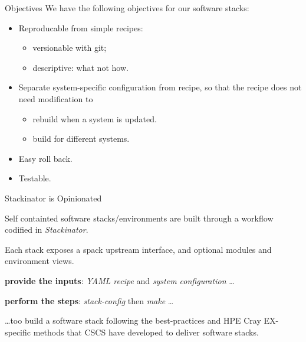 \documentclass[aspectratio=43]{beamer}
\begin{document}
\begin{frame}[fragile]{Objectives}
    We have the following objectives for our software stacks:
    \begin{itemize}
        \item Reproducable from simple recipes:
        \begin{itemize}
            \item versionable with git;
            \item descriptive: what not how.
        \end{itemize}
        \item Separate system-specific configuration from recipe, so that the recipe does not need modification to
        \begin{itemize}
            \item rebuild when a system is updated.
            \item build for different systems.
        \end{itemize}
        \item Easy roll back.
        \item Testable.
    \end{itemize}
\end{frame}


\begin{frame}[fragile]{Stackinator is Opinionated}
    \begin{center}
        Self containted software stacks/environments are built through a workflow codified in \emph{Stackinator}.

    \vspace{10pt}

        Each stack exposes a spack upstream interface, and optional modules and environment views.

    \vspace{10pt}

        \textbf{provide the inputs}: \emph{YAML recipe} and \emph{system configuration} \dots

    \vspace{10pt}

        \textbf{perform the steps}: \emph{stack-config} then \emph{make} \dots

    \vspace{10pt}

     \dots too build a software stack following the best-practices and HPE Cray EX-specific methods that CSCS have developed to deliver software stacks.
    \end{center}
\end{frame}
\end{document}
